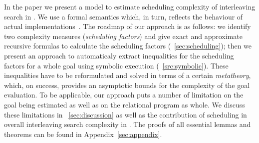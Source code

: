 In the paper we present a model to estimate scheduling complexity of interleaving search in \mK. We use a formal semantics which, in turn, reflects the
behaviour of actual implementations~\cite{CertifiedSemantics}. The roadmap of our approach is as follows: we identify two complexity measures (\emph{scheduling factors}) and
give exact and approximate recursive formulas to calculate the scheduling factors (\sectionword~\ref{sec:scheduling}); then we present an approach to
automaticaly extract inequalities for the scheduling factors for a whole goal using symbolic execution (\sectionword~\ref{src:symbolic}). These inequalities have
to be reformulated and solved in terms of a certain \emph{metatheory}, which, on success, provides an asymptotic bounds for the complexity of
the goal evaluation. To be applicable, our approach puts a number of limitation on the goal being estimated as well as on the relational program as whole. We discuss
these limitations in \sectionword~\ref{sec:discussion} as well as the contribution of scheduling in overall interleaving search complexity in \mK. The proofs of
all essential lemmas and theorems can be found in Appendix~\ref{sec:appendix}.


